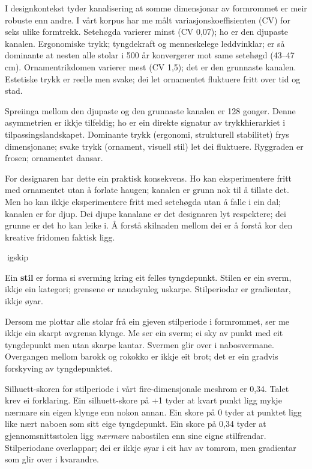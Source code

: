I designkontekst tyder kanalisering at somme dimensjonar av formrommet er meir robuste enn andre. I vårt korpus har me målt variasjonskoeffisienten (CV) for seks ulike formtrekk. Setehøgda varierer minst (CV  0,07); ho er den djupaste kanalen. Ergonomiske trykk; tyngdekraft og menneskelege leddvinklar; er så dominante at nesten alle stolar i 500 år konvergerer mot same setehøgd (43--47 cm). Ornamentrikdomen varierer mest (CV  1,5); det er den grunnaste kanalen. Estetiske trykk er reelle men svake; dei let ornamentet fluktuere fritt over tid og stad.

Spreiinga mellom den djupaste og den grunnaste kanalen er 128 gonger. Denne asymmetrien er ikkje tilfeldig; ho er ein direkte signatur av trykkhierarkiet i tilpassingslandskapet. Dominante trykk (ergonomi, strukturell stabilitet) frys dimensjonane; svake trykk (ornament, visuell stil) let dei fluktuere. Ryggraden er frosen; ornamentet dansar.

For designaren har dette ein praktisk konsekvens. Ho kan eksperimentere fritt med ornamentet utan å forlate haugen; kanalen er grunn nok til å tillate det. Men ho kan ikkje eksperimentere fritt med setehøgda utan å falle i ein dal; kanalen er for djup. Dei djupe kanalane er det designaren lyt respektere; dei grunne er det ho kan leike i. Å forstå skilnaden mellom dei er å forstå kor den kreative fridomen faktisk ligg.

igskip

Ein \textbf{stil} er forma si sverming kring eit felles tyngdepunkt. Stilen er ein sverm, ikkje ein kategori; grensene er naudsynleg uskarpe. Stilperiodar er gradientar, ikkje øyar.

Dersom me plottar alle stolar frå ein gjeven stilperiode i formrommet, ser me ikkje ein skarpt avgrensa klynge. Me ser ein sverm; ei sky av punkt med eit tyngdepunkt men utan skarpe kantar. Svermen glir over i nabosvermane. Overgangen mellom barokk og rokokko er ikkje eit brot; det er ein gradvis forskyving av tyngdepunktet.

Silhuett-skoren for stilperiode i vårt fire-dimensjonale meshrom er 0,34. Talet krev ei forklaring. Ein silhuett-skore på +1 tyder at kvart punkt ligg mykje nærmare sin eigen klynge enn nokon annan. Ein skore på 0 tyder at punktet ligg like nært naboen som sitt eige tyngdepunkt. Ein skore på 0,34 tyder at gjennomsnittsstolen ligg \textit{nærmare} nabostilen enn sine eigne stilfrendar. Stilperiodane overlappar; dei er ikkje øyar i eit hav av tomrom, men gradientar som glir over i kvarandre.

